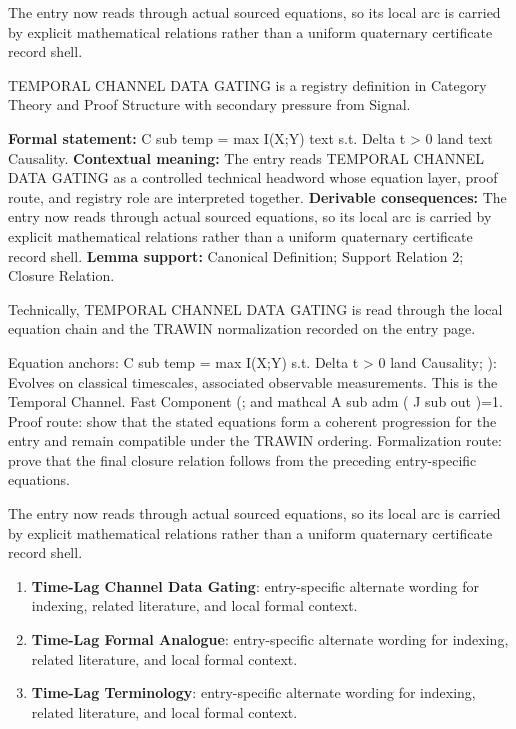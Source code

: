 The entry now reads through actual sourced equations, so its local arc is carried by explicit mathematical relations rather than a uniform quaternary certificate record shell.
\clearpage


\begingroup\small
{}
TEMPORAL CHANNEL DATA GATING is a registry definition in Category Theory and Proof Structure with secondary pressure from Signal.

\begingroup\footnotesize\setlength{\emergencystretch}{3em}\sloppy
\textbf{Formal statement:} C sub temp = max I(X;Y) text s.t. Delta t > 0 land text Causality. \textbf{Contextual meaning:} The entry reads TEMPORAL CHANNEL DATA GATING as a controlled technical headword whose equation layer, proof route, and registry role are interpreted together. \textbf{Derivable consequences:} The entry now reads through actual sourced equations, so its local arc is carried by explicit mathematical relations rather than a uniform quaternary certificate record shell. \textbf{Lemma support:} Canonical Definition; Support Relation 2; Closure Relation.\par
\endgroup

Technically, TEMPORAL CHANNEL DATA GATING is read through the local equation chain and the TRAWIN normalization recorded on the entry page.

Equation anchors: C sub temp = max I(X;Y) s.t. Delta t > 0 land Causality; ): Evolves on classical timescales, associated observable measurements. This is the Temporal Channel. Fast Component (; and mathcal A sub adm ( J sub out )=1. Proof route: show that the stated equations form a coherent progression for the entry and remain compatible under the TRAWIN ordering. Formalization route: prove that the final closure relation follows from the preceding entry-specific equations.

The entry now reads through actual sourced equations, so its local arc is carried by explicit mathematical relations rather than a uniform quaternary certificate record shell.
\endgroup

\begin{enumerate}[leftmargin=1.6em,itemsep=6pt,topsep=4pt]
\item \textbf{Time-Lag Channel Data Gating}: entry-specific alternate wording for indexing, related literature, and local formal context.
\item \textbf{Time-Lag Formal Analogue}: entry-specific alternate wording for indexing, related literature, and local formal context.
\item \textbf{Time-Lag Terminology}: entry-specific alternate wording for indexing, related literature, and local formal context.
\end{enumerate}

